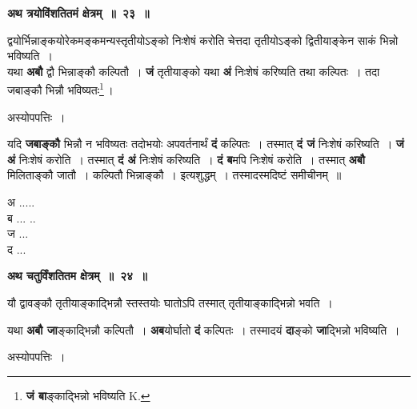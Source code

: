\documentclass[11pt, openany]{book}
\begin{document}
\begin{center}
\textbf{\large अथ त्रयोविंशतितमं क्षेत्रम्~॥~२३~॥}
\end{center}

{\ab द्वयोर्भिन्नाङ्कयोरेकमङ्कमन्यस्तृतीयोऽङ्को निःशेषं करोति चेत्तदा तृतीयोऽङ्को द्वितीयाङ्केन साकं भिन्नो भविष्यति~। }\\

 यथा \textbf{अबौ} द्वौ भिन्नाङ्कौ कल्पितौ~। \textbf{जं} तृतीयाङ्को यथा \textbf{अं} निःशेषं करिष्यति तथा कल्पितः~। तदा जबाङ्कौ भिन्नौ भविष्यतः\renewcommand{\thefootnote}{१}\footnote{\textbf{जं बा}ङ्काद्भिन्नो भविष्यति {\en K.}}\,।

\begin{center}
अस्योपपत्तिः~।
\end{center}

\begin{flushleft}
\begin{minipage}[t]{0.75\textwidth}
\hspace{4mm} यदि \textbf{जबाङ्कौ} भिन्नौ न भविष्यतः तदोभयोः अपवर्तनार्थं \textbf{दं} कल्पितः~। तस्मात् \textbf{दं जं} निःशेषं करिष्यति~। \textbf{जं अं} निःशेषं करोति~। तस्मात् \textbf{दं अं} निःशेषं करिष्यति~। \textbf{दं ब}मपि निःशेषं करोति~। तस्मात् \textbf{अबौ} मिलिताङ्कौ जातौ~। कल्पितौ भिन्नाङ्कौ~। इत्यशुद्धम्~। तस्मादस्मदिष्टं समीचीनम्~॥
\end{minipage} 
\hfill
\begin{minipage}[t]{0.15\textwidth}
अ .....\\ 
ब ... .. \\
ज ...\\
द ...
\end{minipage}
\end{flushleft}
\vspace{-1mm}
 
\begin{center}
\textbf{\large अथ चतुर्विंशतितम क्षेत्रम्~॥~२४~॥}
\end{center}

{\ab यौ द्वावङ्कौ तृतीयाङ्काद्भिन्नौ स्तस्तयोः घातोऽपि तस्मात् तृतीयाङ्काद्भिन्नो भवति~।}

\newpage
यथा \textbf{अबौ जा}ङ्काद्भिन्नौ कल्पितौ~। \textbf{अब}योर्घातो \textbf{दं} कल्पितः~। तस्मादयं \textbf{दा}ङ्को \textbf{जा}द्भिन्नो भविष्यति~। 

\begin{center}
अस्योपपत्तिः~।
\end{center}
\end{document}
